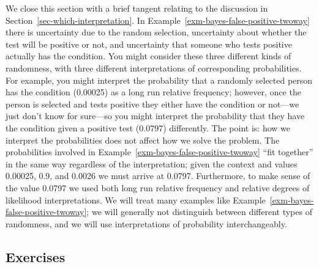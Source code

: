 \documentclass[
  letterpaper,
  DIV=11,
  numbers=noendperiod]{scrreprt}
\theoremstyle{plain}
\theoremstyle{definition}
\theoremstyle{definition}
\theoremstyle{definition}
\theoremstyle{remark}
\begin{document}
We close this section with a brief tangent relating to the discussion in
Section~\ref{sec-which-interpretation}. In
Example~\ref{exm-bayes-false-positive-twoway} there is uncertainty due
to the random selection, uncertainty about whether the test will be
positive or not, and uncertainty that someone who tests positive
actually has the condition. You might consider these three different
kinds of randomness, with three different interpretations of
corresponding probabilities. For example, you might interpret the
probability that a randomly selected person has the condition (0.00025)
as a long run relative frequency; however, once the person is selected
and tests positive they either have the condition or not---we just don't
know for sure---so you might interpret the probability that they have
the condition given a positive test (0.0797) differently. The point is:
how we interpret the probabilities does not affect how we solve the
problem. The probabilities involved in
Example~\ref{exm-bayes-false-positive-twoway} ``fit together'' in the
same way regardless of the interpretation; given the context and values
0.00025, 0.9, and 0.0026 we must arrive at 0.0797. Furthermore, to make
sense of the value 0.0797 we used both long run relative frequency and
relative degrees of likelihood interpretations. We will treat many
examples like Example~\ref{exm-bayes-false-positive-twoway}; we will
generally not distinguish between different types of randomness, and we
will use interpretations of probability interchangeably.

\subsection{Exercises}\label{exercises-3}
\end{document}
